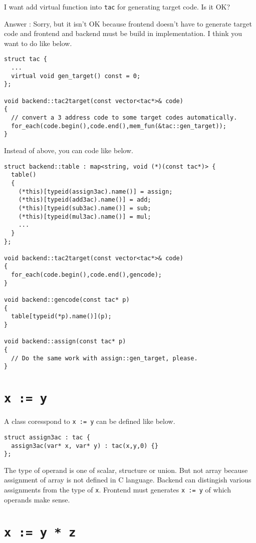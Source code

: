 \begin{QandA}
I want add virtual function into {\tt{tac}} for generating target
code. Is it OK?

Answer : Sorry, but it isn't OK because frontend doesn't have to
generate target code and frontend and backend must be build in
implementation. I think you want to do like below.
\begin{verbatim}
struct tac {
  ...
  virtual void gen_target() const = 0;
};

void backend::tac2target(const vector<tac*>& code)
{
  // convert a 3 address code to some target codes automatically.
  for_each(code.begin(),code.end(),mem_fun(&tac::gen_target));
}
\end{verbatim}
Instead of above, you can code like below.
\begin{verbatim}
struct backend::table : map<string, void (*)(const tac*)> {
  table()
  {
    (*this)[typeid(assign3ac).name()] = assign;
    (*this)[typeid(add3ac).name()] = add;
    (*this)[typeid(sub3ac).name()] = sub;
    (*this)[typeid(mul3ac).name()] = mul;
    ...
  }
};

void backend::tac2target(const vector<tac*>& code)
{
  for_each(code.begin(),code.end(),gencode);
}

void backend::gencode(const tac* p)
{
  table[typeid(*p).name()](p);
}

void backend::assign(const tac* p)
{
  // Do the same work with assign::gen_target, please.
}
\end{verbatim}
\end{QandA}

\section{{\tt{x := y}}}

A class coresspond to {\tt{x := y}} can be defined like below.
\begin{verbatim}
struct assign3ac : tac {
  assign3ac(var* x, var* y) : tac(x,y,0) {}
};
\end{verbatim}
The type of operand is one of scalar, structure or union. But not
array because assignment of array is not defined in C language.
Backend can distingish various assignments from the type of {\tt{x}}.
Frontend must generates {\tt{x := y}} of which operands make sense.

\section{{\tt{x := y * z}}}

